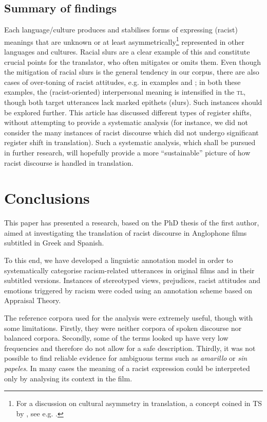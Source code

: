 \documentclass[output=paper]{LSP/langsci}
\begin{document}
\subsection{Summary of findings} \label{sec:2:5:2}
Each language/culture produces and stabilises forms of expressing (racist) meanings that are unknown or at least asymmetrically\footnote{For a discussion on cultural asymmetry in translation, a concept coined in TS by \citet{EvenZohar2005}, see e.g. \citet{Klaudy2012}.} represented in other languages and cultures. Racial slurs are a clear example of this and constitute crucial points for the translator, who often mitigates or omits them. Even though the mitigation of racial slurs is the general tendency in our corpus, there are also cases of over-toning of racist attitudes, e.g. in examples  and ; in both these examples, the (racist-oriented) interpersonal meaning is intensified in the \textsc{tl}, though both target utterances lack marked epithets (slurs). Such instances should be explored further. This article has discussed different types of register shifts, without attempting to provide a systematic analysis (for instance, we did not consider the many instances of racist discourse which did not undergo significant register shift in translation). Such a systematic analysis, which shall be pursued in further research, will hopefully provide a more “sustainable” picture of how racist discourse is handled in translation.

\section{Conclusions} \label{sec:2:6}

This paper has presented a research, based on the PhD thesis of the first author, aimed at investigating the translation of racist discourse in Anglophone films subtitled in Greek and Spanish.

To this end, we have developed a linguistic annotation model in order to systematically categorise racism-related utterances in original films and in their subtitled versions. Instances of stereotyped views, prejudices, racist attitudes and emotions triggered by racism were coded using an annotation scheme based on Appraisal Theory.

The reference corpora used for the analysis were extremely useful, though with some limitations. Firstly, they were neither corpora of spoken discourse nor balanced corpora. Secondly, some of the terms looked up have very low frequencies and therefore do not allow for a safe description. Thirdly, it was not possible to find reliable evidence for ambiguous terms such as \textit{amarillo} or \textit{sin papeles}. In many cases the meaning of a racist expression could be interpreted only by analysing its context in the film.
\end{document}
